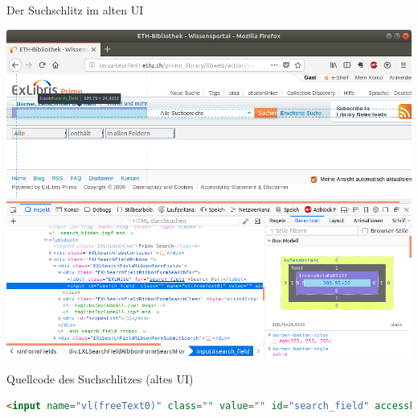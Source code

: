 \begin{frame}{Der Suchschlitz im alten UI}
  \begin{center}
    \includegraphics[width=1\textwidth]{pics/old-ui-searchbar}
  \end{center}
\end{frame}

\begin{frame}[fragile]{Quellcode des Suchschlitzes (altes UI)}
  \selectfont
  \begin{lstlisting}[language=html]
<input name="vl(freeText0)" class="" value="" id="search_field" accesskey="s" type="text">
  \end{lstlisting}
\end{frame}


